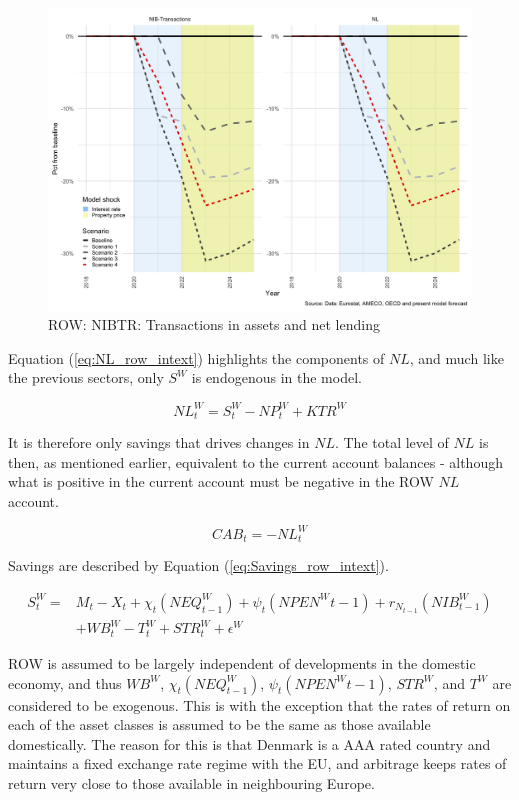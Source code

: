 \documentclass[
]{book}
\begin{document}
\begin{figure}[H]
\includegraphics[width=0.7\linewidth]{figures/fl-fi-sfc-plot-row-indicators-nibtr-1} \caption{ROW: NIBTR: Transactions in assets and net lending}\label{fig:fl-fi-sfc-plot-row-indicators-nibtr}
\end{figure}

Equation (\ref{eq:NL_row_intext}) highlights the components of \(NL\), and much like the previous sectors, only \(S^W\) is endogenous in the model.

\begin{equation}
NL^W_t = S^W_t - NP^W_t + KTR^W
\label{eq:NL_row_intext}
\end{equation}

It is therefore only savings that drives changes in \(NL\). The total level of \(NL\) is then, as mentioned earlier, equivalent to the current account balances - although what is positive in the current account must be negative in the ROW \(NL\) account.

\begin{equation}
CAB_t = -NL^W_t
\label{eq:CAB_row_intext}
\end{equation}

Savings are described by Equation (\ref{eq:Savings_row_intext}).

\begin{equation}
\begin{split}
S^W_t = & M_t - X_t+\chi _t(NEQ^W_{t-1}) + \psi _t(NPEN^W{t-1}) + r_{N_{t-1}}(NIB^W_{t-1})\\
        & + WB^W_t - T^W_t +STR^W_t +\epsilon ^W
\label{eq:Savings_row_intext}
\end{split}
\end{equation}

ROW is assumed to be largely independent of developments in the domestic economy, and thus \(WB^W\), \(\chi _t(NEQ^W_{t-1})\), \(\psi _t(NPEN^W{t-1})\), \(STR^W\), and \(T^W\) are considered to be exogenous. This is with the exception that the rates of return on each of the asset classes is assumed to be the same as those available domestically. The reason for this is that Denmark is a AAA rated country and maintains a fixed exchange rate regime with the EU, and arbitrage keeps rates of return very close to those available in neighbouring Europe.
\end{document}
